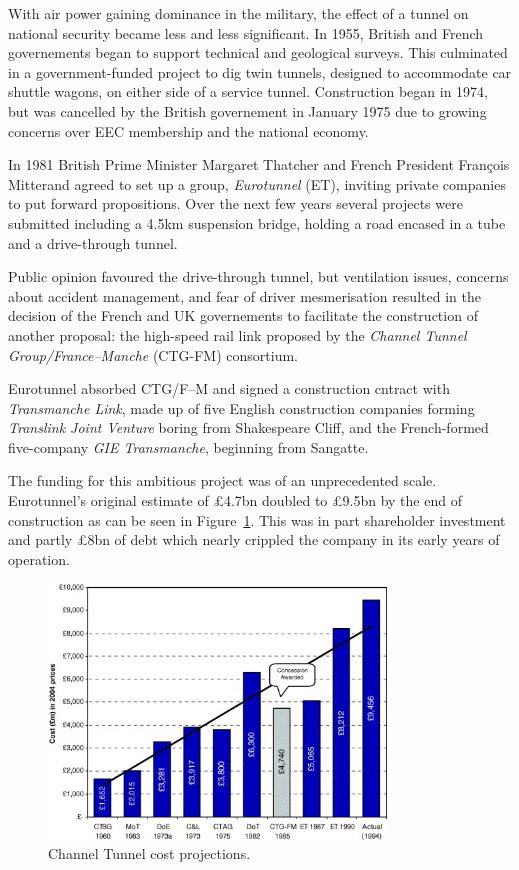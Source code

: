 \documentclass[12pt]{article} %
\begin{document}
With air power gaining dominance in the military, the effect of a tunnel on national security became less and less significant. In 1955, British and French governements began to support technical and geological surveys. This culminated in a government-funded project to dig twin tunnels, designed to accommodate car shuttle wagons, on either side of a service tunnel. Construction began in 1974, but was cancelled by the British governement in January 1975 due to growing concerns over EEC membership and the national economy.

In 1981 British Prime Minister Margaret Thatcher and French President François Mitterand agreed to set up a group, \emph{Eurotunnel} (ET), inviting private companies to put forward propositions. Over the next few years several projects were submitted including a 4.5km suspension bridge, holding a road encased in a tube and a drive-through tunnel.

Public opinion favoured the drive-through tunnel, but ventilation issues, concerns about accident management, and fear of driver mesmerisation resulted in the decision of the French and UK governements to facilitate the construction of another proposal: the high-speed rail link proposed by the \emph{Channel Tunnel Group\slash France--Manche} (CTG-FM) consortium.

Eurotunnel absorbed CTG/F--M and signed a construction cntract with \emph{Transmanche Link}, made up of five English construction companies forming \emph{Translink Joint Venture} boring from Shakespeare Cliff, and the French-formed five-company \emph{GIE Transmanche}, beginning from Sangatte.

The funding for this ambitious project was of an unprecedented scale. Eurotunnel's original estimate of £4.7bn doubled to £9.5bn by the end of construction as can be seen in Figure~\ref{fig:costproj}.\cite{costeval} This was in part shareholder investment and partly £8bn of debt which nearly crippled the company in its early years of operation.

\begin{figure}[tp]
  \centering
  \includegraphics[width=0.8\textwidth]{costproj}
  \caption{Channel Tunnel cost projections.}
  \label{fig:costproj}
\end{figure}
\end{document}
